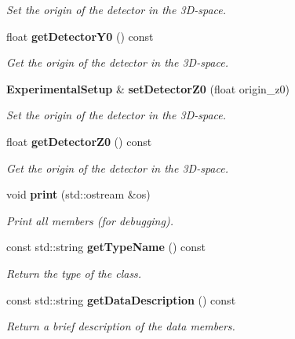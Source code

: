 \begin{DoxyCompactItemize}
\begin{DoxyCompactList}\small\item\em Set the origin of the detector in the 3D-\/space. \item\end{DoxyCompactList}\item 
float {\bf getDetectorY0} () const \label{classCALICE_1_1ExperimentalSetup_a70298a2312261febaaee1440369b8667}

\begin{DoxyCompactList}\small\item\em Get the origin of the detector in the 3D-\/space. \item\end{DoxyCompactList}\item 
{\bf ExperimentalSetup} \& {\bf setDetectorZ0} (float origin\_\-z0)\label{classCALICE_1_1ExperimentalSetup_a20c69d5737d7afa4d3ca5ba61f80a324}

\begin{DoxyCompactList}\small\item\em Set the origin of the detector in the 3D-\/space. \item\end{DoxyCompactList}\item 
float {\bf getDetectorZ0} () const \label{classCALICE_1_1ExperimentalSetup_ac90c01cf3383bfc43094309d5bb7a677}

\begin{DoxyCompactList}\small\item\em Get the origin of the detector in the 3D-\/space. \item\end{DoxyCompactList}\item 
void {\bf print} (std::ostream \&os)\label{classCALICE_1_1ExperimentalSetup_a526e124a082191bf6a06d1ddc6a1ea38}

\begin{DoxyCompactList}\small\item\em Print all members (for debugging). \item\end{DoxyCompactList}\item 
const std::string {\bf getTypeName} () const \label{classCALICE_1_1ExperimentalSetup_ae1b3cfdebacc3300684be0ada84173dd}

\begin{DoxyCompactList}\small\item\em Return the type of the class. \item\end{DoxyCompactList}\item 
const std::string {\bf getDataDescription} () const \label{classCALICE_1_1ExperimentalSetup_a5f0b3c312b3b1d53eac95192e39b5211}

\begin{DoxyCompactList}\small\item\em Return a brief description of the data members. \item\end{DoxyCompactList}\end{DoxyCompactItemize}
